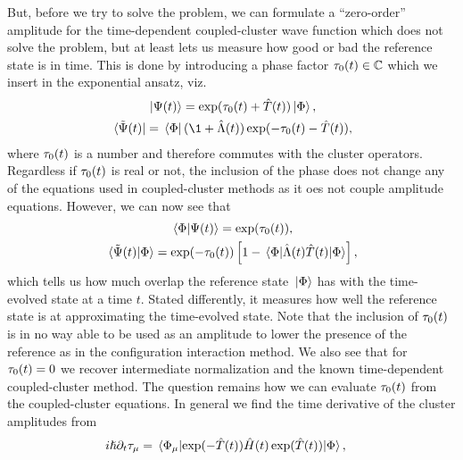         But, before we try to solve the problem, we can formulate a
        ``zero-order'' amplitude for the time-dependent coupled-cluster wave
        function which does not solve the problem, but at least lets us
        measure how good or bad the reference state is in time.
        This is done by introducing a phase factor $\tau_0(t) \in
        \mathbb{C}$ which we insert in the exponential ansatz, viz.
        \begin{gather}
            \ket*{\Psi(t)}
            = \exponential(\clustamp_0(t) + \clust(t))\ket*{\slat},
            \\
            \bra*{\tilde{\Psi}(t)}
            = \bra*{\slat}(\1 + \clustl(t))
            \exponential(-\clustamp_0(t) - \clust(t)),
        \end{gather}
        where $\tau_0(t)$ is a number and therefore commutes with the
        cluster operators.
        Regardless if $\tau_0(t)$ is real or not, the inclusion of the
        phase does not change any of the equations used in coupled-cluster
        methods as it oes not couple amplitude equations.
        However, we can now see that
        \begin{gather}
            \braket*{\slat}{\Psi(t)} = \exponential(\clustamp_0(t)),
            \\
            \braket*{\tilde{\Psi}(t)}{\slat}
            = \exponential(-\clustamp_0(t)) \brak{
                1
                - \mel*{\slat}{
                    \clustl(t)
                    \clust(t)
                }{\slat}
            },
        \end{gather}
        which tells us how much overlap the reference state $\ket*{\Phi}$ has
        with the time-evolved state at a time $t$.
        Stated differently, it measures how well the reference state
        is at approximating the time-evolved state.
        Note that the inclusion of $\tau_0(t)$ is in no way able to be
        used as an amplitude to lower the presence of the reference as in
        the configuration interaction method.
        We also see that for $\tau_0(t) = 0$ we recover intermediate
        normalization and the known time-dependent coupled-cluster method.
        The question remains how we can evaluate $\tau_0(t)$ from the
        coupled-cluster equations.
        In general we find the time derivative of the cluster amplitudes
        from
        \begin{align}
            i\hslash \partial_t\clustamp_{\mu}
            &=
            \mel*{\slat_{\mu}}{
                \exponential(-\clust(t))
                \hamil(t)
                \exponential(\clust(t))
            }{\slat},
        \end{align}
